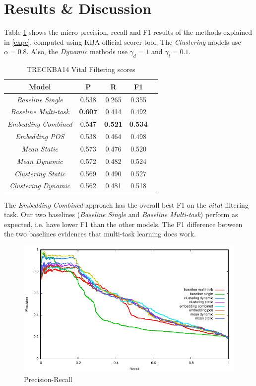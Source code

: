 \documentclass{article}
\begin{document}
\section{Results \& Discussion}

Table \ref{res} shows the micro precision, recall and F1 results of the methods explained in \ref{expe}, computed using KBA official scorer tool. The \textit{Clustering} models use $\alpha=0.8$. Also, the \textit{Dynamic} methods use $\gamma_d=1$ and $\gamma_i=0.1$.

\begin{table}[H]
\center
\begin{tabular}{|c|c|c|c|c|} \hline
\textbf{Model} & \textbf{P} & \textbf{R} & \textbf{F1} \\ \hline\hline
{\textit{Baseline Single}} & 0.538 & 0.265 & 0.355 \\ \hline
{\textit{Baseline Multi-task}} & \textbf{0.607} & 0.414 & 0.492 \\ \hline
{\textit{Embedding Combined}} & 0.547 & \textbf{0.521} & \textbf{0.534} \\ \hline
{\textit{Embedding POS}} & 0.538 & 0.464 & 0.498 \\ \hline
{\textit{Mean Static}} & 0.573 & 0.476 & 0.520 \\ \hline
{\textit{Mean Dynamic}} & 0.572 & 0.482 & 0.524 \\ \hline
{\textit{Clustering Static}} & 0.569 & 0.490 & 0.527 \\ \hline
{\textit{Clustering Dynamic}} & 0.562 & 0.481 & 0.518 \\ \hline
\end{tabular}
\caption{TRECKBA14 Vital Filtering scores}
\label{res}
\end{table}

The {\textit{Embedding Combined}} approach has the overall best F1 on the $vital$ filtering task. Our two baselines ({\textit{Baseline Single}} and {\textit{Baseline Multi-task}}) perform as expected, i.e. have lower F1 than the other models. The F1 difference between the two baselines evidences that multi-task learning does work.

\begin{figure}[h!]
\centering
\includegraphics[width=.5\textwidth]{overlapped.pdf}
\caption{Precision-Recall}
\label{precrecall}
\end{figure}
\end{document}
